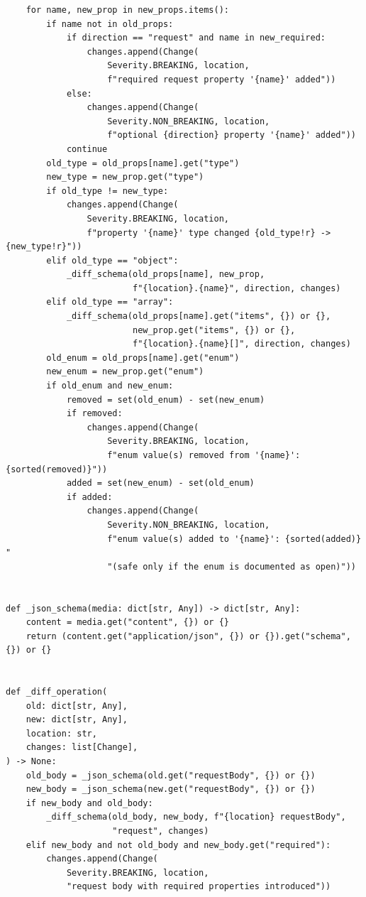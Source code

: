 \begin{verbatim}
    for name, new_prop in new_props.items():
        if name not in old_props:
            if direction == "request" and name in new_required:
                changes.append(Change(
                    Severity.BREAKING, location,
                    f"required request property '{name}' added"))
            else:
                changes.append(Change(
                    Severity.NON_BREAKING, location,
                    f"optional {direction} property '{name}' added"))
            continue
        old_type = old_props[name].get("type")
        new_type = new_prop.get("type")
        if old_type != new_type:
            changes.append(Change(
                Severity.BREAKING, location,
                f"property '{name}' type changed {old_type!r} -> {new_type!r}"))
        elif old_type == "object":
            _diff_schema(old_props[name], new_prop,
                         f"{location}.{name}", direction, changes)
        elif old_type == "array":
            _diff_schema(old_props[name].get("items", {}) or {},
                         new_prop.get("items", {}) or {},
                         f"{location}.{name}[]", direction, changes)
        old_enum = old_props[name].get("enum")
        new_enum = new_prop.get("enum")
        if old_enum and new_enum:
            removed = set(old_enum) - set(new_enum)
            if removed:
                changes.append(Change(
                    Severity.BREAKING, location,
                    f"enum value(s) removed from '{name}': {sorted(removed)}"))
            added = set(new_enum) - set(old_enum)
            if added:
                changes.append(Change(
                    Severity.NON_BREAKING, location,
                    f"enum value(s) added to '{name}': {sorted(added)} "
                    "(safe only if the enum is documented as open)"))


def _json_schema(media: dict[str, Any]) -> dict[str, Any]:
    content = media.get("content", {}) or {}
    return (content.get("application/json", {}) or {}).get("schema", {}) or {}


def _diff_operation(
    old: dict[str, Any],
    new: dict[str, Any],
    location: str,
    changes: list[Change],
) -> None:
    old_body = _json_schema(old.get("requestBody", {}) or {})
    new_body = _json_schema(new.get("requestBody", {}) or {})
    if new_body and old_body:
        _diff_schema(old_body, new_body, f"{location} requestBody",
                     "request", changes)
    elif new_body and not old_body and new_body.get("required"):
        changes.append(Change(
            Severity.BREAKING, location,
            "request body with required properties introduced"))


\end{verbatim}
